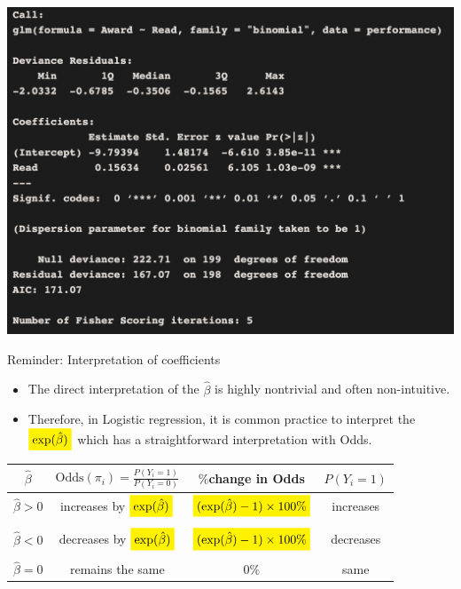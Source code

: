 \documentclass[compress]{beamer}
\begin{document}
\begin{frame}
\includegraphics[scale=.45]{LROut.png} 
\end{frame}


\begin{frame}{Reminder: Interpretation of coefficients}
	\vspace{-3mm}
\begin{itemize}
	\item
	The direct interpretation of the $\hat{\beta}$ is highly nontrivial and often non-intuitive. 
 	\item 
	Therefore, in Logistic regression, it is common practice  to interpret the  $\HLTY{\exp(\hat{{\beta}})}$ which has a straightforward interpretation with Odds. 
\end{itemize}
\begin{table}[ht]
	\centering
	\begin{tabular}{cccc}
	\hline
 $\hat{{\beta}}$ &  $\text{Odds}(\pi_i)=\frac{P(Y_i = 1)}{P(Y_i = 0)}$ & $\% $change in Odds &  $P(Y_i = 1)$\\ 
	\hline
$\hat{{\beta}}> 0$ & increases by $\HLTY{\exp(\hat{{\beta}})}$ &  $\HLTY{\tiny (\exp(\hat{{\beta}})-1)\times 100\%}$  & increases \\& & &  \\
$\hat{{\beta}}< 0$ & decreases by $\HLTY{\exp(\hat{{\beta}})}$& $\HLTY{\tiny (\exp(\hat{{\beta}})-1)\times 100\%}$  &  decreases\\& & &  \\
$\hat{{\beta}} = 0$ &remains the  same &  $0\%$ &  same \\
	\hline
	\end{tabular}
\end{table}
\end{frame}
\end{document}
